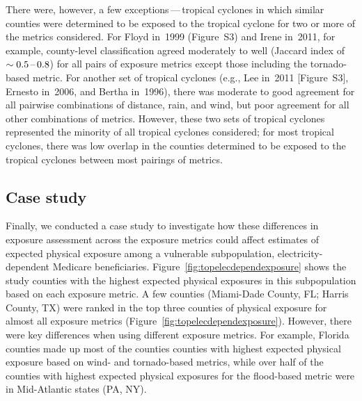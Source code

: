 \begin{comment}
Storms are displayed within
clusters that have similar patterns in county-level exposure agreement for
metric pairs, based on hierarchical clustering using the complete link
method~\parencite{murtagh2012algorithms} (i.e., storms in the same cluster tend
to have similar patterns for the pairwise strength of agreement among metrics);
columns are also ordered based on hierarchical clustering. 
Maps are
available showing the counties identified as exposed under each of five metrics
for the widest-extent storm in each cluster: Hurricane Ivan in~2004
(Figure~\ref{fig:ivanexposure}) and Hurricanes Floyd in~1999, Lee in~2011, Cindy
in~2005, and Katrina in~2005 (Figure~S3).
\end{comment}

There were, however, a few exceptions\,---\,tropical cyclones in which similar
counties were determined to be exposed to the tropical cyclone for two or more
of the metrics considered.  For Floyd in~1999 (Figure~S3) and Irene in~2011,
for example, county-level classification agreed moderately to well (Jaccard
index of~$\sim 0.5\mbox{\,--\,}0.8$) for all pairs of exposure metrics except
those including the tornado-based metric. For another set of tropical cyclones
(e.g., Lee in~2011 [Figure~S3], Ernesto in~2006, and Bertha in~1996), there was
moderate to good agreement for all pairwise combinations of distance, rain, and
wind, but poor agreement for all other combinations of metrics. However, these
two sets of tropical cyclones represented the minority of all tropical cyclones
considered; for most tropical cyclones, there was low overlap in the counties
determined to be exposed to the tropical cyclones between most pairings of
metrics.

\subsection*{Case study}

Finally, we conducted a case study to investigate how these differences in
exposure assessment across the exposure metrics could affect estimates of
expected physical exposure among a vulnerable subpopulation,
electricity-dependent Medicare beneficiaries.
Figure~\ref{fig:topelecdependexposure} shows the study counties with the
highest expected physical exposures in this subpopulation based on each
exposure metric. A few counties (Miami-Dade County, FL; Harris County, TX) were
ranked in the top three counties of physical exposure for almost all exposure
metrics (Figure~\ref{fig:topelecdependexposure}). However, there were key
differences when using different exposure metrics. For example, Florida
counties made up most of the counties counties with highest expected physical
exposure based on wind- and tornado-based metrics, while over half of the
counties with highest expected physical exposures for the flood-based metric
were in Mid-Atlantic states (PA, NY).



